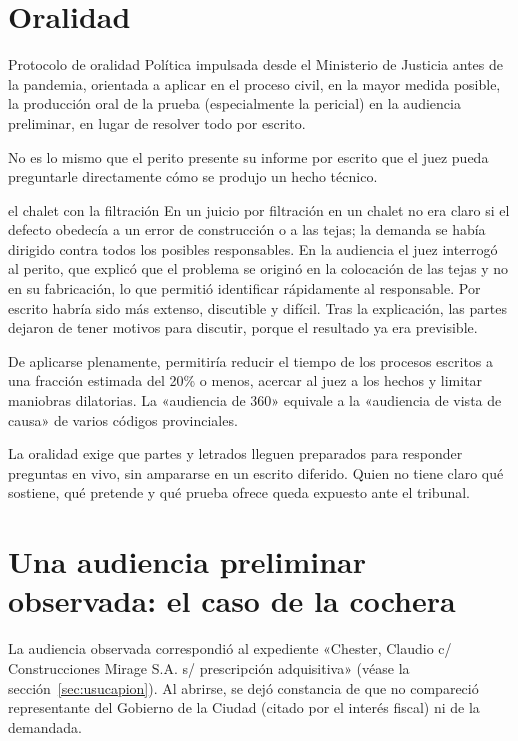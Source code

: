 \documentclass[12pt,oneside]{book}
\begin{document}
\section{Oralidad}

\begin{definicion}{Protocolo de oralidad}
Política impulsada desde el Ministerio de Justicia antes de la pandemia, orientada a aplicar en el proceso civil, en la mayor medida posible, la producción oral de la prueba (especialmente la pericial) en la audiencia preliminar, en lugar de resolver todo por escrito.
\end{definicion}

No es lo mismo que el perito presente su informe por escrito que el juez pueda preguntarle directamente cómo se produjo un hecho técnico.

\begin{ejemplo}{el chalet con la filtración}
En un juicio por filtración en un chalet no era claro si el defecto obedecía a un error de construcción o a las tejas; la demanda se había dirigido contra todos los posibles responsables. En la audiencia el juez interrogó al perito, que explicó que el problema se originó en la colocación de las tejas y no en su fabricación, lo que permitió identificar rápidamente al responsable. Por escrito habría sido más extenso, discutible y difícil. Tras la explicación, las partes dejaron de tener motivos para discutir, porque el resultado ya era previsible.
\end{ejemplo}

De aplicarse plenamente, permitiría reducir el tiempo de los procesos escritos a una fracción estimada del 20\% o menos, acercar al juez a los hechos y limitar maniobras dilatorias. La «audiencia de 360» equivale a la «audiencia de vista de causa» de varios códigos provinciales.

\begin{importante}
La oralidad exige que partes y letrados lleguen preparados para responder preguntas en vivo, sin ampararse en un escrito diferido. Quien no tiene claro qué sostiene, qué pretende y qué prueba ofrece queda expuesto ante el tribunal.
\end{importante}

\section{Una audiencia preliminar observada: el caso de la cochera}

La audiencia observada correspondió al expediente «Chester, Claudio c/ Construcciones Mirage S.A. s/ prescripción adquisitiva» (véase la sección~\ref{sec:usucapion}). Al abrirse, se dejó constancia de que no compareció representante del Gobierno de la Ciudad (citado por el interés fiscal) ni de la demandada.
\end{document}
